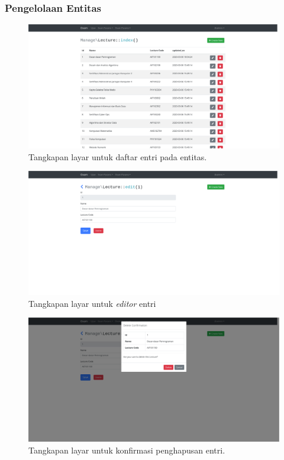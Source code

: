     \subsubsection{Pengelolaan Entitas}
    \begin{figure}
        \centering
        \includegraphics[width=0.7\paperwidth]{Gambar/implemented-interface/admin/entity-lister.png}
        \caption{Tangkapan layar untuk daftar entri pada entitas.}
        \label{fig:screenshot-admin-entity-list}
    \end{figure}
    \begin{figure}
        \centering
        \includegraphics[width=0.7\paperwidth]{Gambar/implemented-interface/admin/entity-editor.png}
        \caption{Tangkapan layar untuk \textit{editor} entri}
        \label{fig:screenshot-admin-entity-edit}
    \end{figure}
    \begin{figure}
        \centering
        \includegraphics[width=0.7\paperwidth]{Gambar/implemented-interface/admin/entity-delete.png}
        \caption{Tangkapan layar untuk konfirmasi penghapusan entri.}
        \label{fig:screenshot-admin-entity-delete}
    \end{figure}
